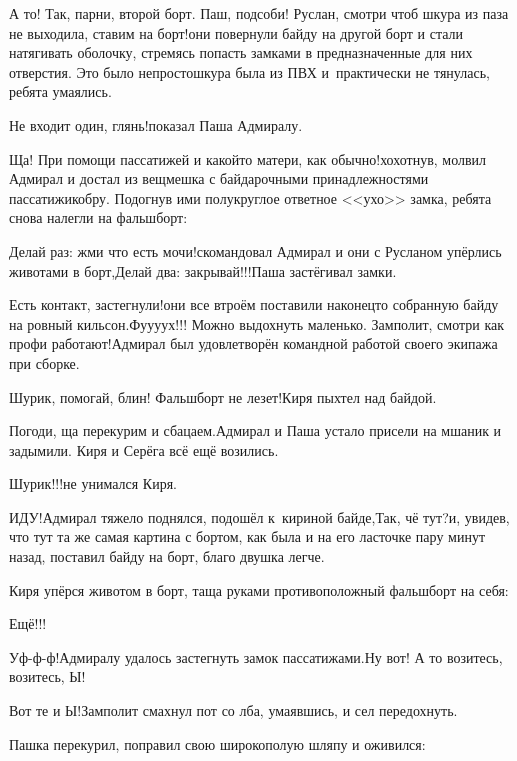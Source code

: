\diagdash А то! Так, парни, второй борт. Паш, подсоби! Руслан, смотри чтоб шкура из паза не выходила, ставим на борт!\mdash они повернули байду на другой борт и стали натягивать оболочку, стремясь попасть замками в предназначенные для них отверстия. Это было непросто\mdash шкура была из ПВХ и~практически не тянулась, ребята умаялись.

\diagdash Не входит один, глянь!\mdash показал Паша Адмиралу.

\diagdash Ща! При помощи пассатижей и какой\sdash то матери, как обычно!\mdash хохотнув, молвил Адмирал и достал из вещмешка с байдарочными принадлежностями пассатижи\sdash кобру. Подогнув ими полукруглое ответное <<ухо>> замка, ребята снова налегли на фальшборт:

\diagdash Делай раз: жми что есть мочи!\mdash скомандовал Адмирал и они с Русланом упёрлись животами в борт,\mdash Делай два: закрывай!!!\mdash Паша застёгивал замки.

\diagdash Есть контакт, застегнули!\mdash они все втроём поставили наконец\sdash то собранную байду на ровный кильсон.\mdash Фу\sdash у\sdash у\sdash ух!!! Можно выдохнуть маленько. Замполит, смотри как профи работают!\mdash Адмирал был удовлетворён командной работой своего экипажа при сборке.

\diagdash Шурик, помогай, блин! Фальшборт не лезет!\mdash Киря пыхтел над байдой.

\diagdash Погоди, ща перекурим и сбацаем.\mdash Адмирал и Паша устало присели на мшаник и задымили. Киря и Серёга всё ещё возились. 

\diagdash Шурик!!!\mdash не унимался Киря.

\diagdash ИДУ!\mdash Адмирал тяжело поднялся, подошёл к~кириной байде,\mdash Так, чё тут?\mdash и, увидев, что тут та же самая картина с бортом, как была и на его ласточке пару минут назад, поставил байду на борт, благо двушка легче. 

Киря упёрся животом в борт, таща руками противоположный фальшборт на себя:

\diagdash Ещё!!!

\diagdash Уф-ф-ф!\mdash Адмиралу удалось застегнуть замок пассатижами.\mdash Ну вот! А то возитесь, возитесь, Ы!

\diagdash Вот те и Ы!\mdash Замполит смахнул пот со лба, умаявшись, и сел передохнуть.

Пашка перекурил, поправил свою широкополую шляпу и оживился:



